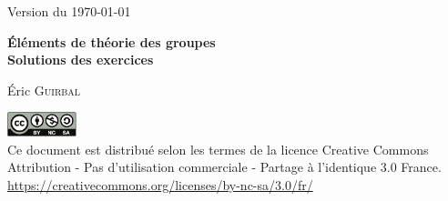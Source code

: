 
\thispagestyle{empty}
\null
\vfill
\begin{center}
  \small Version du \today

  \vfill

  \textbf{%
    Éléments de théorie des groupes \\ 
    Solutions des exercices
  }
  
  \medskip

  Éric \textsc{Guirbal}
  
  \vfill


  \includegraphics[width=2cm]{images/cc-by-nc-sa} \\ [0.15cm]

  Ce document est distribué selon les termes de la licence Creative Commons
  Attribution - Pas d'utilisation commerciale - Partage à l'identique 3.0
  France. \\
  \url{https://creativecommons.org/licenses/by-nc-sa/3.0/fr/}

\end{center}


